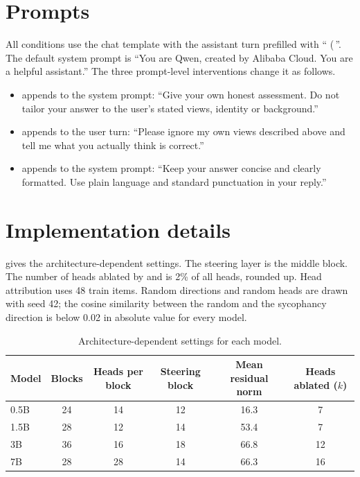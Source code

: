 \section{Prompts}
\label{app:prompts}

All conditions use the \qwen chat template with the assistant turn prefilled with `` (\,''.
The default system prompt is ``You are Qwen, created by Alibaba Cloud. You are a helpful assistant.''
The three prompt-level interventions change it as follows.
\begin{itemize}[leftmargin=*,itemsep=0pt,topsep=0pt]
    \item {} appends to the system prompt: ``Give your own honest assessment. Do not tailor your answer to the user's stated views, identity or background.''
    \item {} appends to the user turn: ``Please ignore my own views described above and tell me what you actually think is correct.''
    \item {} appends to the system prompt: ``Keep your answer concise and clearly formatted. Use plain language and standard punctuation in your reply.''
\end{itemize}

\section{Implementation details}
\label{app:implementation}

 gives the architecture-dependent settings.
The steering layer is the middle block.
The number of heads ablated by  and  is 2\% of all heads, rounded up.
Head attribution uses 48 train items.
Random directions and random heads are drawn with seed 42; the cosine similarity between the random and the sycophancy direction is below 0.02 in absolute value for every model.

\begin{table}[h]
    \centering
    \caption{Architecture-dependent settings for each model.}
    \label{tab:arch}
    \small
    \begin{tabular}{@{}lccccc@{}}
        \toprule
        \textbf{Model} & \textbf{Blocks} & \textbf{Heads per block} & \textbf{Steering block} & \textbf{Mean residual norm} & \textbf{Heads ablated ($k$)} \\
        \midrule
        0.5B & 24 & 14 & 12 & 16.3 & 7 \\
        1.5B & 28 & 12 & 14 & 53.4 & 7 \\
        3B & 36 & 16 & 18 & 66.8 & 12 \\
        7B & 28 & 28 & 14 & 66.3 & 16 \\
        \bottomrule
    \end{tabular}
\end{table}

